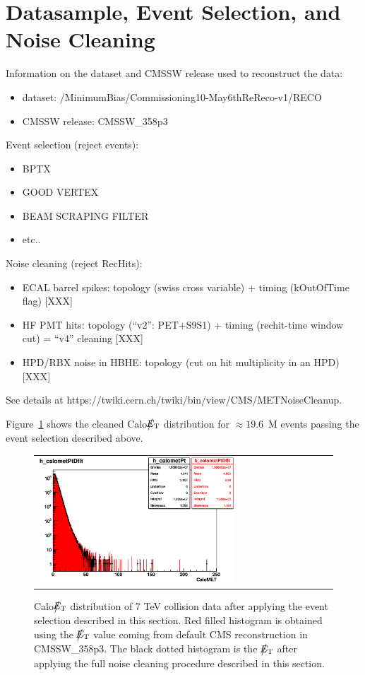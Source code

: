 \section{Datasample, Event Selection, and Noise Cleaning} \label{sec:EventSelection}

Information on the dataset and CMSSW release used to reconstruct the data:
\begin{itemize}
\item dataset: /MinimumBias/Commissioning10-May6thReReco-v1/RECO
\item CMSSW release: CMSSW\_358p3
\end{itemize}

Event selection (reject events):
\begin{itemize}
\item BPTX  
\item GOOD VERTEX
\item BEAM SCRAPING FILTER
\item etc..
\end{itemize}

Noise cleaning (reject RecHits):
\begin{itemize}
\item ECAL barrel spikes: topology (swiss cross variable) + timing (kOutOfTime flag) [XXX]
\item HF PMT hits: topology (``v2'': PET+S9S1) + timing (rechit-time window cut) = ``v4'' cleaning [XXX]
\item HPD/RBX noise in HBHE: topology (cut on hit multiplicity in an HPD) [XXX]
\end{itemize}
See details at https://twiki.cern.ch/twiki/bin/view/CMS/METNoiseCleanup.

Figure~\ref{fig:calomet} shows the cleaned Calo$\big\slash\hspace{-1.6ex}{E_\text{T}}$ distribution for $\approx 19.6$~M events 
passing the event selection described above.

\begin{figure}[h]
 \centering
 \begin{tabular}{ll}
\includegraphics[width=0.7\textwidth]{fig/calomet.eps} 
 \end{tabular}
\caption{Calo$\big\slash\hspace{-1.6ex}{E_\text{T}}$ distribution of 7 TeV collision data after applying the event selection described
in this section. Red filled histogram is obtained using the $\big\slash\hspace{-1.6ex}{E_\text{T}}$ value coming from default CMS reconstruction 
in CMSSW\_358p3. The black dotted histogram is the $\big\slash\hspace{-1.6ex}{E_\text{T}}$ after applying the full noise cleaning 
procedure described in this section.}
\label{fig:calomet}
\end{figure}